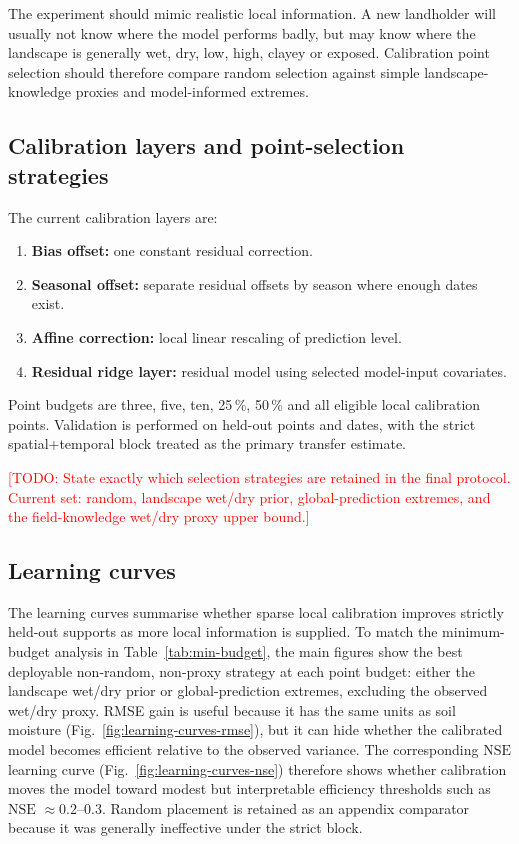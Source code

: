 \documentclass[11pt,a4paper]{article}
\newcommand{\nse}{\ensuremath{\mathrm{NSE}}}
\newcommand{\todo}[1]{\textcolor{red}{[TODO: #1]}}
\begin{document}
The experiment should mimic realistic local information.  A new landholder
will usually not know where the model performs badly, but may know where the
landscape is generally wet, dry, low, high, clayey or exposed.  Calibration
point selection should therefore compare random selection against simple
landscape-knowledge proxies and model-informed extremes.

\subsection{Calibration layers and point-selection strategies}
\label{sec:stage2-methods}

The current calibration layers are:

\begin{enumerate}
\item \textbf{Bias offset:} one constant residual correction.
\item \textbf{Seasonal offset:} separate residual offsets by season where
  enough dates exist.
\item \textbf{Affine correction:} local linear rescaling of prediction level.
\item \textbf{Residual ridge layer:} residual model using selected model-input
  covariates.
\end{enumerate}

Point budgets are three, five, ten, 25\,\%, 50\,\% and all eligible local
calibration points.  Validation is performed on held-out points and dates, with
the strict spatial+temporal block treated as the primary transfer estimate.

\todo{State exactly which selection strategies are retained in the final
protocol.  Current set: random, landscape wet/dry prior, global-prediction
extremes, and the field-knowledge wet/dry proxy upper bound.}

\subsection{Learning curves}\label{sec:stage2-learning}

The learning curves summarise whether sparse local calibration improves
strictly held-out supports as more local information is supplied.  To match the
minimum-budget analysis in Table~\ref{tab:min-budget}, the main figures show
the best deployable non-random, non-proxy strategy at each point budget: either
the landscape wet/dry prior or global-prediction extremes, excluding the
observed wet/dry proxy.  RMSE gain is useful because it has the same units as
soil moisture (Fig.~\ref{fig:learning-curves-rmse}), but it can hide whether
the calibrated model becomes efficient relative to the observed variance.  The
corresponding \nse{} learning curve (Fig.~\ref{fig:learning-curves-nse})
therefore shows whether calibration moves the model toward modest but
interpretable efficiency thresholds such as \nse{} $\approx 0.2$--0.3.  Random
placement is retained as an appendix comparator because it was generally
ineffective under the strict block.
\end{document}
